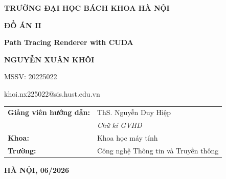 \begin{titlepage}
\centering
\thispagestyle{empty}

{\large\bfseries TRƯỜNG ĐẠI HỌC BÁCH KHOA HÀ NỘI\par}

\vspace{2.5cm}

{\fontsize{30}{36}\selectfont\bfseries ĐỒ ÁN II\par}

\vspace{1.0cm}

{\large\bfseries Path Tracing Renderer with CUDA\par}

\vspace{1.2cm}

{\large\bfseries NGUYỄN XUÂN KHÔI\par}
{\normalsize MSSV: 20225022\par}
{\normalsize khoi.nx225022@sis.hust.edu.vn\par}

\vspace{3.0cm}

\begin{flushleft}
\hspace{1.5cm}
\begin{tabular}{@{}p{4.5cm}p{7cm}@{}}
\textbf{Giảng viên hướng dẫn:} & ThS. Nguyễn Duy Hiệp \hrulefill \\[0.2cm]
                               & \hfill \textit{Chữ kí GVHD} \\[0.8cm]
\textbf{Khoa:}                 & Khoa học máy tính \\[0.4cm]
\textbf{Trường:}               & Công nghệ Thông tin và Truyền thông \\
\end{tabular}
\end{flushleft}

\vfill

{\bfseries HÀ NỘI, 06/2026\par}

\vspace{1cm}
\end{titlepage}
